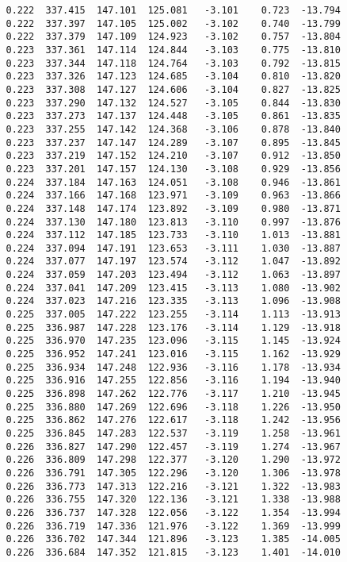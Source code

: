 \begin{verbatim}
   0.222  337.415  147.101  125.081   -3.101    0.723  -13.794
   0.222  337.397  147.105  125.002   -3.102    0.740  -13.799
   0.222  337.379  147.109  124.923   -3.102    0.757  -13.804
   0.223  337.361  147.114  124.844   -3.103    0.775  -13.810
   0.223  337.344  147.118  124.764   -3.103    0.792  -13.815
   0.223  337.326  147.123  124.685   -3.104    0.810  -13.820
   0.223  337.308  147.127  124.606   -3.104    0.827  -13.825
   0.223  337.290  147.132  124.527   -3.105    0.844  -13.830
   0.223  337.273  147.137  124.448   -3.105    0.861  -13.835
   0.223  337.255  147.142  124.368   -3.106    0.878  -13.840
   0.223  337.237  147.147  124.289   -3.107    0.895  -13.845
   0.223  337.219  147.152  124.210   -3.107    0.912  -13.850
   0.223  337.201  147.157  124.130   -3.108    0.929  -13.856
   0.224  337.184  147.163  124.051   -3.108    0.946  -13.861
   0.224  337.166  147.168  123.971   -3.109    0.963  -13.866
   0.224  337.148  147.174  123.892   -3.109    0.980  -13.871
   0.224  337.130  147.180  123.813   -3.110    0.997  -13.876
   0.224  337.112  147.185  123.733   -3.110    1.013  -13.881
   0.224  337.094  147.191  123.653   -3.111    1.030  -13.887
   0.224  337.077  147.197  123.574   -3.112    1.047  -13.892
   0.224  337.059  147.203  123.494   -3.112    1.063  -13.897
   0.224  337.041  147.209  123.415   -3.113    1.080  -13.902
   0.224  337.023  147.216  123.335   -3.113    1.096  -13.908
   0.225  337.005  147.222  123.255   -3.114    1.113  -13.913
   0.225  336.987  147.228  123.176   -3.114    1.129  -13.918
   0.225  336.970  147.235  123.096   -3.115    1.145  -13.924
   0.225  336.952  147.241  123.016   -3.115    1.162  -13.929
   0.225  336.934  147.248  122.936   -3.116    1.178  -13.934
   0.225  336.916  147.255  122.856   -3.116    1.194  -13.940
   0.225  336.898  147.262  122.776   -3.117    1.210  -13.945
   0.225  336.880  147.269  122.696   -3.118    1.226  -13.950
   0.225  336.862  147.276  122.617   -3.118    1.242  -13.956
   0.225  336.845  147.283  122.537   -3.119    1.258  -13.961
   0.226  336.827  147.290  122.457   -3.119    1.274  -13.967
   0.226  336.809  147.298  122.377   -3.120    1.290  -13.972
   0.226  336.791  147.305  122.296   -3.120    1.306  -13.978
   0.226  336.773  147.313  122.216   -3.121    1.322  -13.983
   0.226  336.755  147.320  122.136   -3.121    1.338  -13.988
   0.226  336.737  147.328  122.056   -3.122    1.354  -13.994
   0.226  336.719  147.336  121.976   -3.122    1.369  -13.999
   0.226  336.702  147.344  121.896   -3.123    1.385  -14.005
   0.226  336.684  147.352  121.815   -3.123    1.401  -14.010

\end{verbatim}
